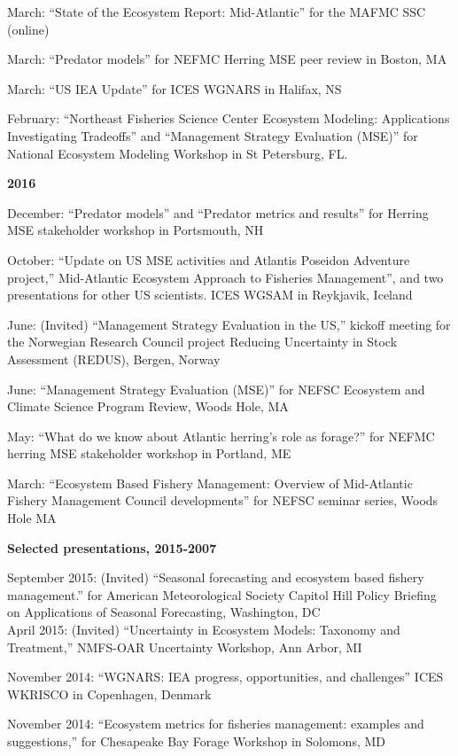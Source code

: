 \documentclass[11pt, a4paper]{awesome-cv}
\begin{document}
March: ``State of the Ecosystem Report: Mid-Atlantic'' for the MAFMC SSC
(online)

March: ``Predator models'' for NEFMC Herring MSE peer review in Boston,
MA

March: ``US IEA Update'' for ICES WGNARS in Halifax, NS

February: ``Northeast Fisheries Science Center Ecosystem Modeling:
Applications Investigating Tradeoffs'' and ``Management Strategy
Evaluation (MSE)'' for National Ecosystem Modeling Workshop in St
Petersburg, FL.

\textbf{2016}

December: ``Predator models'' and ``Predator metrics and results'' for
Herring MSE stakeholder workshop in Portsmouth, NH

October: ``Update on US MSE activities and Atlantis Poseidon Adventure
project,'' Mid-Atlantic Ecosystem Approach to Fisheries Management'',
and two presentations for other US scientists. ICES WGSAM in Reykjavik,
Iceland

June: (Invited) ``Management Strategy Evaluation in the US,'' kickoff
meeting for the Norwegian Research Council project Reducing Uncertainty
in Stock Assessment (REDUS), Bergen, Norway

June: ``Management Strategy Evaluation (MSE)'' for NEFSC Ecosystem and
Climate Science Program Review, Woods Hole, MA

May: ``What do we know about Atlantic herring's role as forage?'' for
NEFMC herring MSE stakeholder workshop in Portland, ME

March: ``Ecosystem Based Fishery Management: Overview of Mid-Atlantic
Fishery Management Council developments'' for NEFSC seminar series,
Woods Hole MA

\textbf{Selected presentations, 2015-2007}

September 2015: (Invited) ``Seasonal forecasting and ecosystem based
fishery management.'' for American Meteorological Society Capitol Hill
Policy Briefing on Applications of Seasonal Forecasting, Washington,
DC\\
April 2015: (Invited) ``Uncertainty in Ecosystem Models: Taxonomy and
Treatment,'' NMFS-OAR Uncertainty Workshop, Ann Arbor, MI

November 2014: ``WGNARS: IEA progress, opportunities, and challenges''
ICES WKRISCO in Copenhagen, Denmark

November 2014: ``Ecosystem metrics for fisheries management: examples
and suggestions,'' for Chesapeake Bay Forage Workshop in Solomons, MD
\end{document}
